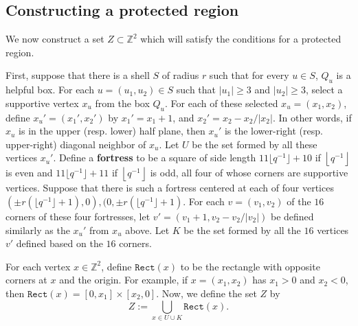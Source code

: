 \documentclass{article}
\newcommand{\floor}[1]{\left\lfloor#1\right \rfloor}
\newcommand{\bZ}{{\mathbb Z}}
\numberwithin{equation}{section}
\begin{document}
\subsection{Constructing a protected region}

We now construct a set $Z \subset \bZ^2$ which will satisfy the conditions for a protected region.

First, suppose that there is a shell $S$ of radius $r$ such that for every $u \in S$, $Q_u$ is a helpful box. 
For each $u = (u_1, u_2) \in S$ such that $|u_1| \geq 3$ and $|u_2| \geq 3$, select a supportive vertex $x_u$ from the box $Q_u$.
For each of these selected $x_u = (x_1, x_2)$, define $x_u' = (x_1', x_2')$ by $x_1' = x_1 + 1$, and $x_2' = x_2 - x_2/|x_2|$.
In other words, if $x_u$ is in the upper (resp. lower) half plane, then $x_u'$ is the lower-right (resp. upper-right) diagonal neighbor of $x_u$.
Let $U$ be the set formed by all these vertices $x_u'$.  
Define a \textbf{fortress} to be a square of side length $11\lfloor q^{-1} \rfloor + 10$ if $\floor{q^{-1}}$ is even and $11\lfloor q^{-1} \rfloor + 11$ if $\floor{q^{-1}}$ is odd, all four of whose corners are supportive vertices.
Suppose that there is such a fortress centered at each of four vertices $(\pm r(\lfloor q^{-1} \rfloor + 1), 0), (0, \pm r(\lfloor q^{-1} \rfloor + 1)$.
For each $v = (v_1,v_2)$ of the $16$ corners of these four fortresses, let $v' = (v_1 + 1, v_2 - v_2/|v_2|)$ be defined similarly as the $x_u'$ from $x_u$ above.
Let $K$ be the set formed by all the $16$ vertices $v'$ defined based on the $16$ corners. 

For each vertex $x \in \bZ^2$, define $\texttt{Rect}(x)$ to be the rectangle with opposite corners at $x$ and the origin. 
For example, if $x = (x_1, x_2)$ has $x_1 > 0$ and $x_2 < 0$, then $\texttt{Rect}(x) = [0, x_1] \times [x_2, 0]$.
Now, we define the set $Z$ by
\begin{equation}
    \label{def:Z}
    Z := \bigcup_{x \in U \cup K} \texttt{Rect}(x).
\end{equation}
\end{document}
